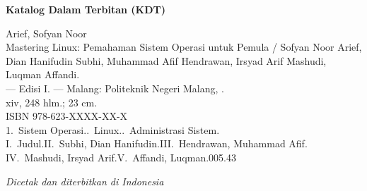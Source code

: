 \begin{titlepage}
\vspace{0.45cm}

\begin{tcolorbox}[
    enhanced,
    colback=white,
    colframe=black!45,
    boxrule=0.5pt,
    arc=1.5pt,
    left=8pt,
    right=8pt,
    top=8pt,
    bottom=8pt
]
{\bfseries\sffamily Katalog Dalam Terbitan (KDT)}\par
\vspace{0.25cm}
\begingroup
\setlength{\parindent}{0pt}
Arief, Sofyan Noor\\
\hspace*{1em}Mastering Linux: Pemahaman Sistem Operasi untuk Pemula /
Sofyan Noor Arief, Dian Hanifudin Subhi, Muhammad Afif Hendrawan,
Irsyad Arif Mashudi, Luqman Affandi.\\
\hspace*{1em}--- Edisi I. --- Malang: Politeknik Negeri Malang, \the\year.\\
\hspace*{1em}xiv, 248 hlm.; 23 cm.\\[0.2cm]
ISBN 978-623-XXXX-XX-X\\[0.2cm]
1.~Sistem Operasi..~Linux..~Administrasi Sistem.\\
I.~Judul.\quad II.~Subhi, Dian Hanifudin.\quad III.~Hendrawan, Muhammad Afif.\\
IV.~Mashudi, Irsyad Arif.\quad V.~Affandi, Luqman.\hfill 005.43
\endgroup
\end{tcolorbox}

\vfill

{\small\itshape Dicetak dan diterbitkan di Indonesia\par}

\end{titlepage}

\cleardoublepage
